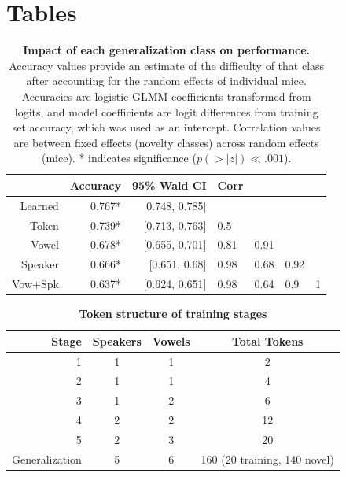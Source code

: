 \documentclass[preprint, NumberedRefs]{JASAnew}\usepackage[]{graphicx}\usepackage[]{color}
\begin{document}
%


\newpage

\section{Tables}

\begin{table}[ht]
\caption{\label{lmmtab}{\textbf{Impact of each generalization class on performance.} Accuracy values provide an estimate of the difficulty of that class after accounting for the random effects of individual mice. Accuracies are logistic GLMM coefficients transformed from logits, and model coefficients are logit differences from training set accuracy, which was used as an intercept. Correlation values are between fixed effects (novelty classes) across random effects (mice). * indicates significance ($p(>|z|)\ll.001$).}}
\begin{ruledtabular}
\begin{tabular}{rrr|llll}
  \hline
 & Accuracy & 95\% Wald CI & Corr &  &  &  \\ 
  \hline
Learned & 0.767* & [0.748, 0.785] &  &  &  &  \\ 
  Token & 0.739* & [0.713, 0.763] & 0.5 &  &  &  \\ 
  Vowel & 0.678* & [0.655, 0.701] & 0.81 & 0.91 &  &  \\ 
  Speaker & 0.666* & [0.651, 0.68] & 0.98 & 0.68 & 0.92 &  \\ 
  Vow+Spk & 0.637* & [0.624, 0.651] & 0.98 & 0.64 & 0.9 & 1 \\ 
   \hline
\end{tabular}

\end{ruledtabular}
\end{table}
\clearpage


\begin{table}
\label{trainsteps}
\caption{\textbf{Token structure of training stages}}
\begin{ruledtabular}
\begin{tabular}{rccc}
Stage & Speakers & Vowels & Total Tokens\\
\midrule
1 & 1 & 1 & 2\\
2 & 1 & 1 & 4\\
3 & 1 & 2 & 6\\
4 & 2 & 2 & 12\\
5 & 2 & 3 & 20\\
Generalization & 5 & 6 & 160 (20 training, 140 novel)\\
\end{tabular}
\end{ruledtabular}

\end{table}
\clearpage
\end{document}
